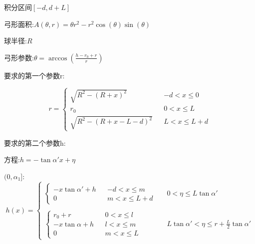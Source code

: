 \documentclass[UTF8]{ctexart}
\begin{document}
    积分区间\([-d,d+L]\)

    弓形面积:\(A(\theta,r) = \theta r^2 - r^2\cos (\theta) \sin (\theta)\)

    球半径:\(R\)

    弓形参数:\(\theta  = \arccos(\frac{h-r_0+r}{r}) \)

    要求的第一个参数r:

    \begin{equation}
        r=\left\{
        \begin{aligned}
            \sqrt{R^2- (R+x)^2}& & -d<x\leq 0 \\
            r_0 & &0<x\leq L\\
            \sqrt{R^2- (R+x-L-d)^2}& & L<x\leq L+d 
        \end{aligned}
        \right.
    \end{equation}

    要求的第二个参数h:

    方程:\(h = -\tan \alpha 'x + \eta\)


    \( ( 0,\alpha_1 ] \):
    \begin{equation}
        h(x)=\left\{
        \begin{aligned}
            \left\{
                \begin{aligned}
                    - x\tan\alpha' + h& &-d<x\leq m \\
                    0 & &m < x \leq L+d
                \end{aligned}
            \right. & & 0<\eta \leq L\tan \alpha'\\
            &&\\
            \left\{
                \begin{aligned}
                    r_0+r & &0 < x \leq l\\
                    - x\tan\alpha + h& &l<x\leq m \\
                    0& &m<x\leq L
                \end{aligned}
            \right. & &  L\tan \alpha' <\eta \leq r + \frac{L}{2}\tan{\alpha'}
        \end{aligned}
        \right.
    \end{equation}
\end{document}
